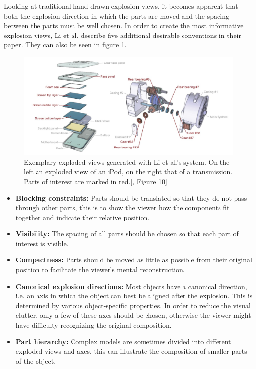 Looking at traditional hand-drawn explosion views, it becomes apparent that both the explosion direction in which the parts are moved and the spacing between the parts must be well chosen. 
In order to create the most informative explosion views, Li et al.\cite{Wilmot_Li_2008} describe five additional desirable conventions in their paper.
They can also be seen in figure \ref{fig:exampleExpl_Li2008}.
\begin{figure}[h]

	\centering
	\includegraphics[width=.9\linewidth]{fig/Images/Li_2008}
	\caption[]{Exemplary exploded views generated with Li et al.'s system. On the left an exploded view of an iPod, on the right that of a transmission. Parts of interest are marked in red.[\cite{Wilmot_Li_2008}, Figure 10]}
	\label{fig:exampleExpl_Li2008}
\end{figure}


\begin{itemize}
	\item \textbf{Blocking constraints:} Parts should be translated so that they do not pass through other parts, this is to show the viewer how the components fit together and indicate their relative position.
	\item \textbf{Visibility:} The spacing of all parts should be chosen so that each part of interest is visible.
	\item \textbf{Compactness:} Parts should be moved as little as possible from their original position to facilitate the viewer's mental reconstruction.
	\item \textbf{Canonical explosion directions:} Most objects have a canonical direction, i.e. an axis in which the object can best be aligned after the explosion. This is determined by various object-specific properties. In order to reduce the visual clutter, only a few of these axes should be chosen, otherwise the viewer might have difficulty recognizing the original composition.
	\item \textbf{Part hierarchy:} Complex models are sometimes divided into different exploded views and axes, this can illustrate the composition of smaller parts of the object.
	\label{items:best_practise}
\end{itemize}

